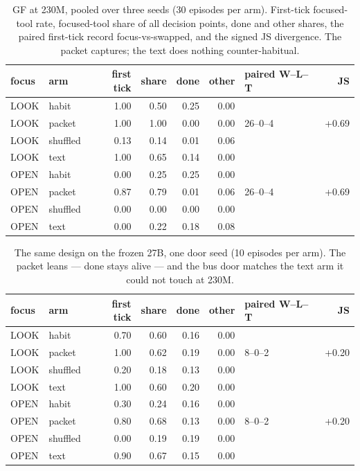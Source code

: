 \documentclass[11pt]{article}
\begin{document}
\begin{table}[t]
\centering
\small
\setlength{\tabcolsep}{4pt}
\begin{tabular}{llrrrrlr}
\toprule
focus & arm & first tick & share & done & other & paired W--L--T & JS \\
\midrule
LOOK & habit & 1.00 & 0.50 & 0.25 & 0.00 &  &  \\
LOOK & packet & 1.00 & 1.00 & 0.00 & 0.00 & 26--0--4 & +0.69 \\
LOOK & shuffled & 0.13 & 0.14 & 0.01 & 0.06 &  &  \\
LOOK & text & 1.00 & 0.65 & 0.14 & 0.00 &  &  \\
OPEN & habit & 0.00 & 0.25 & 0.25 & 0.00 &  &  \\
OPEN & packet & 0.87 & 0.79 & 0.01 & 0.06 & 26--0--4 & +0.69 \\
OPEN & shuffled & 0.00 & 0.00 & 0.00 & 0.00 &  &  \\
OPEN & text & 0.00 & 0.22 & 0.18 & 0.08 &  &  \\
\bottomrule
\end{tabular}
\caption{GF at 230M, pooled over three seeds (30 episodes per arm).
First-tick focused-tool rate, focused-tool share of all decision
points, done and other shares, the paired first-tick record
focus-vs-swapped, and the signed JS divergence. The packet captures;
the text does nothing counter-habitual.}
\label{tab:focus230}
\end{table}

\begin{table}[t]
\centering
\small
\setlength{\tabcolsep}{4pt}
\begin{tabular}{llrrrrlr}
\toprule
focus & arm & first tick & share & done & other & paired W--L--T & JS \\
\midrule
LOOK & habit & 0.70 & 0.60 & 0.16 & 0.00 &  &  \\
LOOK & packet & 1.00 & 0.62 & 0.19 & 0.00 & 8--0--2 & +0.20 \\
LOOK & shuffled & 0.20 & 0.18 & 0.13 & 0.00 &  &  \\
LOOK & text & 1.00 & 0.60 & 0.20 & 0.00 &  &  \\
OPEN & habit & 0.30 & 0.24 & 0.16 & 0.00 &  &  \\
OPEN & packet & 0.80 & 0.68 & 0.13 & 0.00 & 8--0--2 & +0.20 \\
OPEN & shuffled & 0.00 & 0.19 & 0.19 & 0.00 &  &  \\
OPEN & text & 0.90 & 0.67 & 0.15 & 0.00 &  &  \\
\bottomrule
\end{tabular}
\caption{The same design on the frozen 27B, one door seed (10
episodes per arm). The packet leans --- done stays alive --- and the
bus door matches the text arm it could not touch at 230M.}
\label{tab:focus27}
\end{table}
\end{document}
